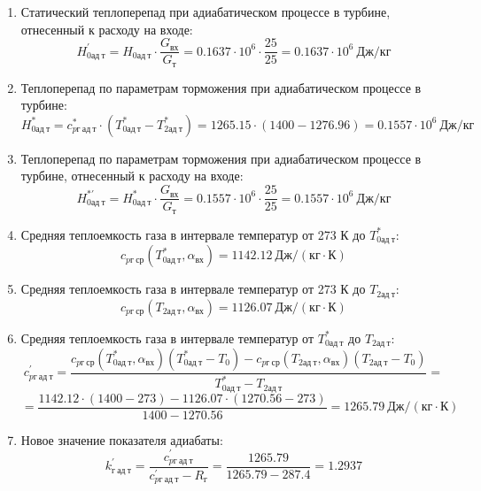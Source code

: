 \documentclass[a4paper,10pt]{article}
\begin{document}
\begin{enumerate}
        \item Статический теплоперепад при адиабатическом процессе в турбине, отнесенный к расходу на входе:
        \[
            H_{0ад\ т}^\prime = H_{0ад\ т} \cdot \frac{ G_{вх} }{ G_т }  =
                0.1637 \cdot 10^6 \cdot
                \frac{ 25 }{ 25 } =
            0.1637 \cdot 10^6 \ Дж/кг
        \]

        \item Теплоперепад по параметрам торможения при адиабатическом процессе в турбине:
        \[
            H_{0ад\ т}^* = c_{pг\ ад\ т}^* \cdot \left(
            T_{0ад\ т}^* - T_{2ад\ т}^*
            \right) =
            1265.15 \cdot \left(
            1400 - 1276.96
            \right) =
            0.1557 \cdot 10^6 \ Дж/кг
        \]

        \item Теплоперепад по параметрам торможения при адиабатическом процессе в турбине, отнесенный к расходу на входе:
        \[
            H_{0ад\ т}^{*\prime} = H_{0ад\ т}^* \cdot \frac{ G_{вх} }{ G_т }  =
                0.1557 \cdot 10^6 \cdot
                \frac{ 25 }{ 25 } =
            0.1557 \cdot 10^6 \ Дж/кг
        \]

        \item Средняя теплоемкость газа в интервале температур от 273 К до $T_{0ад\ т}^*$:
        \[
            c_{pг\ ср} (T_{0ад\ т}^*, \alpha_{вх}) =
            1142.12 \ Дж/(кг \cdot К)
        \]

        \item Средняя теплоемкость газа в интервале температур от 273 К до $T_{2ад\ т}$:
        \[
            c_{pг\ ср} (T_{2ад\ т}, \alpha_{вх}) =
            1126.07 \ Дж/(кг \cdot К)
        \]

        \item Средняя теплоемкость газа в интервале температур от $T_{0ад\ т}^*$ до $T_{2ад\ т}$:
        \[
            c_{pг\ ад\ т}^\prime = \frac{
		        c_{pг\ ср} (T_{0ад\ т}^*, \alpha_{вх}) (T_{0ад\ т}^* - T_0) - c_{pг\ ср} (T_{2ад\ т}, \alpha_{вх})(T_{2ад\ т} - T_0)
		    }{
		        T_{0ад\ т}^* - T_{2ад\ т}} =\]
        \[    =\frac{
		        1142.12 \cdot
                (1400 - 273) -
		        1126.07 \cdot
                (1270.56 - 273)
		    }{
		        1400 - 1270.56} =
		    1265.79 \ Дж / (кг \cdot К)
        \]

        \item Новое значение показателя адиабаты:
        \[
            k_{г\ ад\ т}^\prime = \frac{c_{pг\ ад\ т}^\prime}{c_{pг\ ад\ т}^\prime - R_г} =
                \frac{
                    1265.79
                }{
                    1265.79 - 287.4
                }
            = 1.2937
        \]


\end{enumerate}
\end{document}
